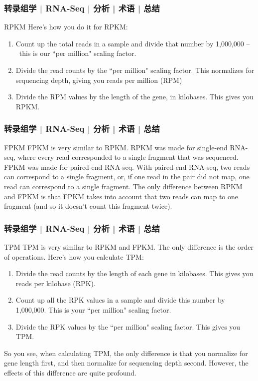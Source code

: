\begin{frame}
  \frametitle{转录组学 | RNA-Seq | 分析 | 术语 | 总结}
  \begin{block}{RPKM}
    Here's how you do it for RPKM:
    \begin{enumerate}
      \item Count up the total reads in a sample and divide that number by 1,000,000 –\ this is our ``per million" scaling factor.
      \item Divide the read counts by the ``per million" scaling factor. This normalizes for sequencing depth, giving you reads per million (RPM)
      \item Divide the RPM values by the length of the gene, in kilobases. This gives you RPKM.
    \end{enumerate}
  \end{block}
\end{frame}

\begin{frame}
  \frametitle{转录组学 | RNA-Seq | 分析 | 术语 | 总结}
  \begin{block}{FPKM}
 FPKM is very similar to RPKM. RPKM was made for single-end RNA-seq, where every read corresponded to a single fragment that was sequenced. FPKM was made for paired-end RNA-seq. With paired-end RNA-seq, two reads can correspond to a single fragment, or, if one read in the pair did not map, one read can correspond to a single fragment. The only difference between RPKM and FPKM is that FPKM takes into account that two reads can map to one fragment (and so it doesn't count this fragment twice). 
  \end{block}
\end{frame}

\begin{frame}
  \frametitle{转录组学 | RNA-Seq | 分析 | 术语 | 总结}
  \begin{block}{TPM}
    TPM is very similar to RPKM and FPKM. The only difference is the order of operations. Here's how you calculate TPM:
    \begin{enumerate}
      \item Divide the read counts by the length of each gene in kilobases. This gives you reads per kilobase (RPK).
      \item Count up all the RPK values in a sample and divide this number by 1,000,000. This is your ``per million" scaling factor.
      \item Divide the RPK values by the ``per million" scaling factor. This gives you TPM.
    \end{enumerate}
    So you see, when calculating TPM, the only difference is that you normalize for gene length first, and then normalize for sequencing depth second. However, the effects of this difference are quite profound.
  \end{block}
\end{frame}

